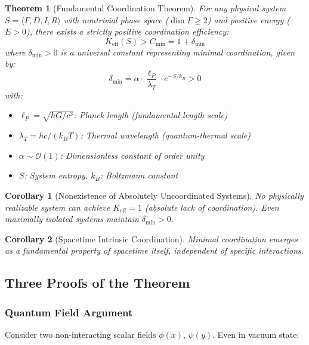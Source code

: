 \documentclass[11pt,a4paper]{article}
\newtheorem{theorem}{Theorem}
\newtheorem{corollary}{Corollary}
\begin{document}
\begin{theorem}[Fundamental Coordination Theorem]
	For any physical system $S = \langle \Gamma, D, I, R \rangle$ with nontrivial phase space ($\dim\Gamma \geq 2$) and positive energy ($E > 0$), there exists a strictly positive coordination efficiency:
	\begin{equation}
		\boxed{K_{\mathrm{eff}}(S) > C_{\min} = 1 + \delta_{\min}}
	\end{equation}
	where $\delta_{\min} > 0$ is a universal constant representing minimal coordination, given by:
	\begin{equation}
		\delta_{\min} = \alpha \cdot \frac{\ell_P}{\lambda_T} \cdot e^{-S/k_B} > 0
	\end{equation}
	with:
	\begin{itemize}
		\item $\ell_P = \sqrt{\hbar G/c^3}$: Planck length (fundamental length scale)
		\item $\lambda_T = \hbar c/(k_B T)$: Thermal wavelength (quantum-thermal scale)
		\item $\alpha \sim \mathcal{O}(1)$: Dimensionless constant of order unity
		\item $S$: System entropy, $k_B$: Boltzmann constant
	\end{itemize}
\end{theorem}

\begin{corollary}[Nonexistence of Absolutely Uncoordinated Systems]
	No physically realizable system can achieve $K_{\mathrm{eff}} = 1$ (absolute lack of coordination). Even maximally isolated systems maintain $\delta_{\min} > 0$.
\end{corollary}

\begin{corollary}[Spacetime Intrinsic Coordination]
	Minimal coordination emerges as a fundamental property of spacetime itself, independent of specific interactions.
\end{corollary}

\subsection{Three Proofs of the Theorem}

\subsubsection{Quantum Field Argument}

Consider two non-interacting scalar fields $\phi(x)$, $\psi(y)$. Even in vacuum state:
\end{document}
